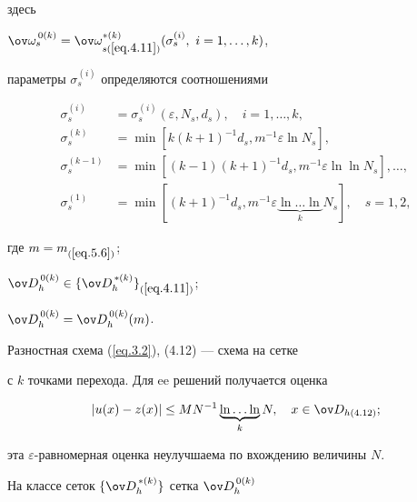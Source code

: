 здесь


$\ov\omega_s^{\,0(k)}=


\ov\omega_{s(\ref{eq.4.11})}^{*(k)}(\sigma_s^{(i)}, \ i=1,\dotsc,k)$,


параметры $\sigma_s^{(i)}$ определяются соотношениями


\begin{equation}\label{eq.4.12b}


\begin{split}


\sigma_s^{(i)}&=\sigma_s^{(i)}(\varepsilon,N_s,d_s),\quad i=1,\dotsc,k, \\


\sigma_s^{(k)}&=\min[k(k+1)^{-1}d_s,m^{-1}\varepsilon \ln N_s],\\


\sigma_s^{(k-1)}&=\min [(k-1)(k+1)^{-1}


d_s,m^{-1}\varepsilon\ln\ln N_s],\dotsc,\\


\sigma_s^{(1)}&=\min[(k+1)^{-1}d_s,


m^{-1}\varepsilon\underbrace{\ln\dotsc\ln}_{k}N_s], \quad s=1,2,


\end{split}


\tag{4.12б}


\end{equation}


где $m=m_{(\ref{eq.5.6})}$;


$\ov D_h^{\,0(k)}\in \{\ov D_h^{\,*(k)}\}_{(\ref{eq.4.11})}$;


$\ov D^{\,0(k)}_h=\ov D^{\,0(k)}_h(m)$.


\addtocounter{equation}{2}





Разностная схема (\ref{eq.3.2}), (4.12) --- схема на сетке


с $k$ точками перехода. Для ee решений получается оценка


\begin{equation} \label{eq.4.13}


|u(x)-z(x)|\le M N^{-1}\underbrace{\ln\dotsc\ln}_{k}N, \quad


x\in \ov D_{h(4.12)};


\end{equation}


эта $\varepsilon$-равномерная оценка неулучшаема по вхождению величины $N$.


На классе сеток $\{\ov D_h^{\,*(k)}\}$ сетка $\ov D_h^{\,0(k)}$


